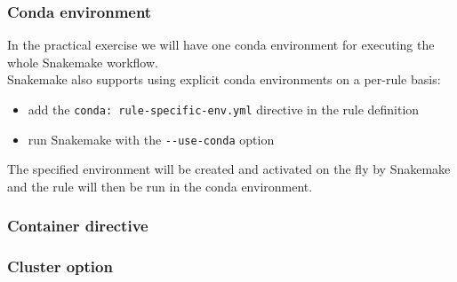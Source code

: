 \begin{frame}[containsverbatim]
\frametitle{Conda environment}
\begin{block}{}
In the practical exercise we will have one conda environment for executing the whole Snakemake workflow. \\
Snakemake also supports using explicit conda environments on a per-rule basis:
\begin{itemize}
    \item add the \verb|conda: rule-specific-env.yml| directive in the rule definition 
    \item run Snakemake with the \verb|--use-conda| option 
\end{itemize}
The specified environment will be created and activated on the fly by Snakemake and the rule will then be run in the conda environment.
\end{block}
\end{frame}
\begin{frame}[containsverbatim]
\frametitle{Container directive}
\end{frame}
\begin{frame}[containsverbatim]
\frametitle{Cluster option}

\end{frame}
